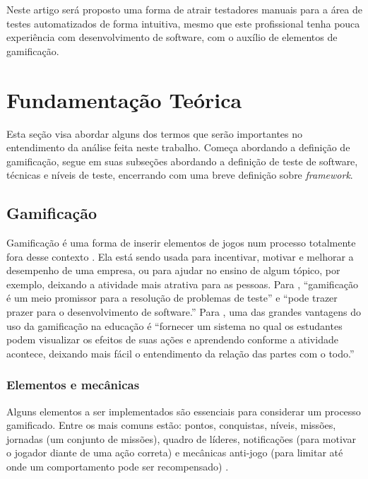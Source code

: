 \documentclass[twoside,english,brazilian]{UNISINOSartigo}
\begin{document}
Neste artigo será proposto uma forma de atrair testadores manuais para a área de testes automatizados de forma intuitiva, mesmo que este profissional tenha pouca experiência com desenvolvimento de software, com o auxílio de elementos de gamificação.
 


\section{Fundamentação Teórica}

Esta seção visa abordar alguns dos termos que serão importantes no entendimento da análise feita neste trabalho. Começa abordando a definição de gamificação, segue em suas subseções abordando a definição de teste de software, técnicas e níveis de teste, encerrando com uma breve definição sobre \textit{framework}.

\subsection{Gamificação}

Gamificação é uma forma de inserir elementos de jogos num processo totalmente fora desse contexto \cite{Dale}. Ela está sendo usada para incentivar, motivar e melhorar a desempenho de uma empresa, ou para ajudar no ensino de algum tópico, por exemplo, deixando a atividade mais atrativa para as pessoas. Para \cite{DeJesus}, ``gamificação é um meio promissor para a resolução de problemas de teste'' e ``pode trazer prazer para o desenvolvimento de software.'' Para \cite{Elgrably}, uma das grandes vantagens do uso da gamificação na educação é ``fornecer um sistema no qual os estudantes podem visualizar os efeitos de suas ações e aprendendo conforme a atividade acontece, deixando mais fácil o entendimento da relação das partes com o todo.'' 


\subsubsection{Elementos e mecânicas}

Alguns elementos a ser implementados são essenciais para considerar um processo gamificado. Entre os mais comuns estão: pontos, conquistas, níveis, missões, jornadas (um conjunto de missões), quadro de líderes, notificações (para motivar o jogador diante de uma ação correta) e mecânicas anti-jogo (para limitar até onde um comportamento pode ser recompensado) \cite{Dale}.
\end{document}
